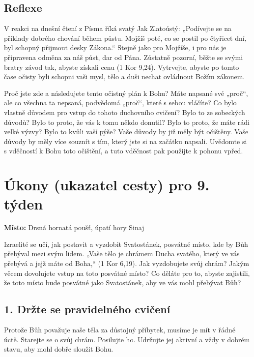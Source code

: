 \documentclass[11pt]{article}
\begin{document}
\subsection*{Reflexe}
V reakci na dnešní čtení z Písma říká svatý Jak Zlatoústý: „Podívejte se na příklady dobrého chování během
půstu. Mojžíš poté, co se postil po čtyřicet dní, byl schopný přijmout desky Zákona.“ Stejně jako pro
Mojžíše, i pro nás je připravena odměna za náš půst, dar od Pána. Zůstatně pozorní, běžte se svými bratry
závod tak, abyste získali cenu (1 Kor 9,24). Vytrvejte, abyste po tomto čase očisty byli schopni vaši mysl,
tělo a duši nechat ovládnout Božím zákonem.

Proč jste zde a následujete tento očistný plán k Bohu? Máte napsané své „proč“, ale co všechna ta nepsaná,
podvědomá „proč“, které s sebou vláčíte? Co bylo vlastně důvodem pro vstup do tohoto duchovního cvičení?
Bylo to ze sobeckých důvodů? Bylo to proto, že vás k tomu někdo donutil? Bylo to proto, že máte rádi velké
výzvy? Bylo to kvůli vaší pýše? Vaše důvody by již měly být očištěny. Vaše důvody by měly více souznít
s tím, který jste si na začátku napsali. Uvědomte si s vděčností k Bohu toto očištění, a tuto vděčnost pak
použijte k pohonu vpřed.


\newpage
\section*{Úkony (ukazatel cesty) pro 9. týden}

\textbf{Místo:} Drsná hornatá poušť, úpatí hory Sinaj

Izraelité se učí, jak postavit a vyzdobit Svatostánek, posvátné místo, kde by Bůh přebýval mezi svým lidem.
„Vaše tělo je chrámem Ducha svatého, který ve vás přebývá a jejž máte od Boha,“ (1 Kor 6,19). Jak
vyzdobujete svůj chrám? Jakým věcem dovolujete vstup na toto posvátné místo? Co děláte pro to, abyste
zajistili, že toto místo bude posvátné jako Svatostánek, aby ve vás mohl přebývat Bůh?

\subsection*{1. Držte se pravidelného cvičení}
Protože Bůh považuje naše těla za důstojný příbytek, musíme je mít v řádné úctě. Starejte se o svůj chrám. Posilujte ho. Udržujte jej aktivní a vždy v dobrém stavu, aby mohl dobře sloužit Bohu.
\end{document}
